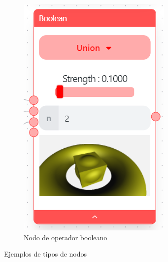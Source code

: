 \begin{figure}[!h]
\begin{subfigure}[b]{0.32\textwidth}
        \includegraphics[width=\textwidth]{Plantilla-TFG-master/img/nodo_bool.png}
        \caption{Nodo de operador booleano}
    \end{subfigure}
    \hfill
    \caption{Ejemplos de tipos de nodos}
\end{figure}

